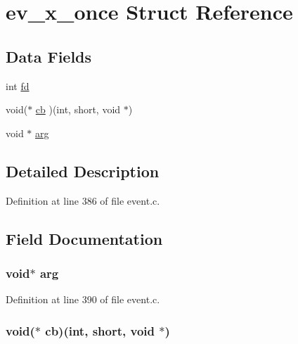 \hypertarget{structev__x__once}{\section{ev\-\_\-x\-\_\-once \-Struct \-Reference}
\label{structev__x__once}
}
\subsection*{\-Data \-Fields}
\begin{DoxyCompactItemize}
\item 
int \hyperlink{structev__x__once_a6f8059414f0228f0256115e024eeed4b}{fd}
\item 
void($\ast$ \hyperlink{structev__x__once_a5e20cc2d3b4d4967380f263227acc60c}{cb} )(int, short, void $\ast$)
\item 
void $\ast$ \hyperlink{structev__x__once_a9ce2ec4812a92cb6ab39f6e81e9173a9}{arg}
\end{DoxyCompactItemize}


\subsection{\-Detailed \-Description}


\-Definition at line 386 of file event.\-c.



\subsection{\-Field \-Documentation}
\hypertarget{structev__x__once_a9ce2ec4812a92cb6ab39f6e81e9173a9}{
\subsubsection[{arg}]{\setlength{\rightskip}{0pt plus 5cm}void$\ast$ {\bf arg}}}\label{structev__x__once_a9ce2ec4812a92cb6ab39f6e81e9173a9}


\-Definition at line 390 of file event.\-c.

\hypertarget{structev__x__once_a5e20cc2d3b4d4967380f263227acc60c}{
\subsubsection[{cb}]{\setlength{\rightskip}{0pt plus 5cm}void($\ast$ {\bf cb})(int, short, void $\ast$)}}\label{structev__x__once_a5e20cc2d3b4d4967380f263227acc60c}


